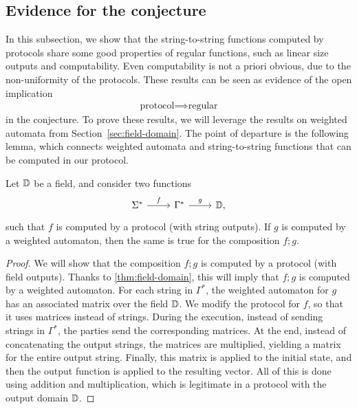 \subsection{Evidence for the conjecture}
\label{sec:continuity}
In this subsection, we show that the string-to-string functions computed by protocols share some  good properties of regular functions, such as linear size outputs and computability. Even computability is not a priori obvious, due to the non-uniformity of the protocols. These results can be seen as evidence of the open implication 
\begin{align*}
\text{protocol} \implies \text{regular}
\end{align*}
in the conjecture. To prove these results, we will leverage the results on weighted automata from Section~\ref{sec:field-domain}.
The point of departure is the following lemma, which connects weighted automata and string-to-string functions that can be computed in our protocol.

    \begin{lemma}
        \label{lem:postcomposition-weighted-automaton}
        Let $\mathbb D$ be a field, and consider two functions
        \[
        \begin{tikzcd}
        \Sigma^* 
        \ar[r,"f"]
        &
        \Gamma^*
        \ar[r,"g"]
        & 
        \domain,
        \end{tikzcd}
        \]
        such that $f$ is computed by a protocol (with string outputs). If $g$  is computed by a weighted automaton, then the same is true for the composition  $f;g$.
    \end{lemma}
    \begin{proof}
        We will show that the composition $f;g$ is computed by a protocol (with field outputs). Thanks to \cref{thm:field-domain}, this will imply that $f;g$ is computed by a weighted automaton.
        For each string in $\Gamma^*$, the weighted automaton for $g$ has an associated matrix over the field $\mathbb D$. We modify the protocol for $f$, so that it uses matrices instead of strings. During the execution, instead of sending strings in $\Gamma^*$, the parties send  the corresponding matrices. At the end, instead of concatenating the output strings, the matrices are multiplied, yielding a matrix for the entire output string. Finally, this matrix is applied to the initial state, and then the output function is applied to the resulting vector. All of this is done using addition and multiplication, which is legitimate in a protocol with the output domain $\mathbb D$.
    \end{proof}


